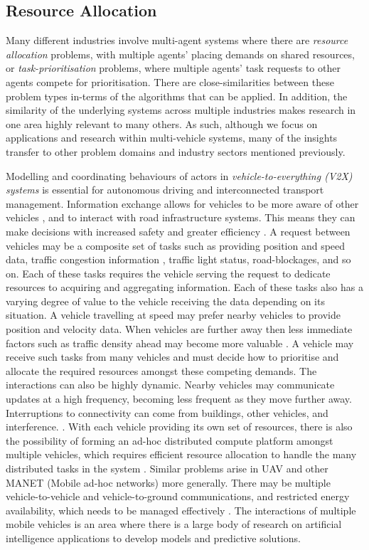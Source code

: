 \subsection{Resource Allocation}
\label{section:background}

Many different industries involve multi-agent systems where there are
\textit{resource allocation} problems, with multiple agents' placing demands on
shared resources, or \textit{task-prioritisation} problems, where multiple
agents' task requests to other agents compete for prioritisation. There are close-similarities between these problem types in-terms of the algorithms that can be applied. In addition, the similarity of the underlying systems across multiple industries makes research in one area highly relevant to many others. As such, although we focus on applications and research within multi-vehicle systems, many of the insights transfer to other problem domains and industry sectors mentioned previously.

Modelling and coordinating behaviours of actors in
\textit{vehicle-to-everything (V2X) systems} is essential for autonomous
driving and interconnected transport management. Information exchange allows
for vehicles to be more aware of other vehicles \cite{Nothdurft2011}, and to
interact with road infrastructure systems. This means they can make decisions
with increased safety and greater efficiency \cite{Xie2017a}. A request between
vehicles may be a composite set of tasks such as providing position and speed
data, traffic congestion information \cite{Schunemann2010}, traffic light
status, road-blockages, and so on. Each of these tasks requires the vehicle
serving the request to dedicate resources to acquiring and aggregating
information. Each of these tasks also has a varying degree of value to the
vehicle receiving the data depending on its situation. A vehicle travelling at
speed may prefer nearby vehicles to provide position and velocity data. When
vehicles are further away then less immediate factors such as traffic density
ahead may become more valuable \cite{Rizzo2016,Eiza2015}. A vehicle may receive
such tasks from many vehicles and must decide how to prioritise and allocate the required resources amongst these competing demands. The interactions can also be highly dynamic. Nearby vehicles may communicate updates at a high frequency, becoming less frequent as they move further away. Interruptions to connectivity can come from buildings, other vehicles, and interference. \cite{BelagalMath2017,Wang2019a}. With each vehicle providing its own set of resources, there is also the possibility of forming an ad-hoc distributed compute platform amongst multiple vehicles, which requires efficient resource allocation to handle the many distributed tasks in the system \cite{Feng2017,Xu2020}. Similar problems arise in UAV and other MANET (Mobile ad-hoc networks) more generally. There may be multiple vehicle-to-vehicle and vehicle-to-ground communications, and restricted energy availability, which needs to be managed effectively \cite{Cui}. The interactions of multiple mobile vehicles is an area where there is a large body of research on artificial intelligence applications \cite{Althamary2019,Tong2019} to develop models and predictive solutions.


